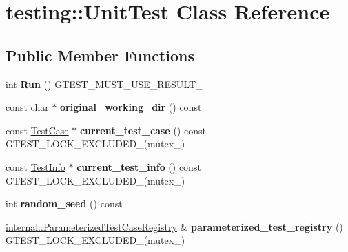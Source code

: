 \hypertarget{classtesting_1_1UnitTest}{}\section{testing\+:\+:Unit\+Test Class Reference}
\label{classtesting_1_1UnitTest}
\subsection*{Public Member Functions}
\begin{DoxyCompactItemize}
\item 
\mbox{\label{classtesting_1_1UnitTest_a2febc800536b44500565f4c423f359d3}} 
int {\bfseries Run} () G\+T\+E\+S\+T\+\_\+\+M\+U\+S\+T\+\_\+\+U\+S\+E\+\_\+\+R\+E\+S\+U\+L\+T\+\_\+
\item 
\mbox{\label{classtesting_1_1UnitTest_af6809b7747785c80f7a2f31f6b39b152}} 
const char $\ast$ {\bfseries original\+\_\+working\+\_\+dir} () const
\item 
\mbox{\label{classtesting_1_1UnitTest_a2bf61896036ae03edbd7bceed14f9e18}} 
const \hyperlink{classtesting_1_1TestCase}{Test\+Case} $\ast$ {\bfseries current\+\_\+test\+\_\+case} () const G\+T\+E\+S\+T\+\_\+\+L\+O\+C\+K\+\_\+\+E\+X\+C\+L\+U\+D\+E\+D\+\_\+(mutex\+\_\+)
\item 
\mbox{\label{classtesting_1_1UnitTest_a088eaf814a33085ace3d881d22e6bdea}} 
const \hyperlink{classtesting_1_1TestInfo}{Test\+Info} $\ast$ {\bfseries current\+\_\+test\+\_\+info} () const G\+T\+E\+S\+T\+\_\+\+L\+O\+C\+K\+\_\+\+E\+X\+C\+L\+U\+D\+E\+D\+\_\+(mutex\+\_\+)
\item 
\mbox{\label{classtesting_1_1UnitTest_adddc090a06f2d3a0e68f3762ee262688}} 
int {\bfseries random\+\_\+seed} () const
\item 
\mbox{\label{classtesting_1_1UnitTest_a8f9c5d0d9f1b6d23c94070944a43c550}} 
\hyperlink{classtesting_1_1internal_1_1ParameterizedTestCaseRegistry}{internal\+::\+Parameterized\+Test\+Case\+Registry} \& {\bfseries parameterized\+\_\+test\+\_\+registry} () G\+T\+E\+S\+T\+\_\+\+L\+O\+C\+K\+\_\+\+E\+X\+C\+L\+U\+D\+E\+D\+\_\+(mutex\+\_\+)

\end{DoxyCompactItemize}
